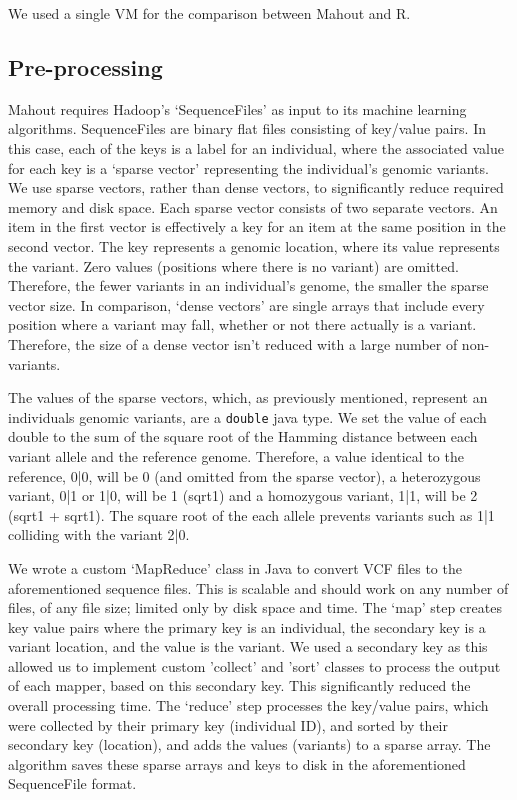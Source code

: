 \documentclass{bioinfo}
\begin{document}
\begin{methods}
We used a single VM for the comparison between Mahout and R.

\subsection*{Pre-processing}
\label{Sec:preprocessing}
Mahout requires Hadoop's `SequenceFiles' as input to its machine learning algorithms. SequenceFiles are binary flat files consisting of key/value pairs. In this case, each of the keys is a
label for an individual, where the associated value for each key is a `sparse vector' representing the individual's genomic variants. We use sparse vectors, rather than
dense vectors, to significantly reduce required memory and disk space. Each sparse vector consists of two separate vectors. An item in the first vector is
effectively a key for an item at the same position in the second vector. The key represents a genomic location, where its value represents the variant. Zero values (positions where there is no variant)
are omitted. Therefore, the fewer variants in an individual's genome, the smaller the sparse vector size. In comparison, `dense vectors' are single arrays that
include every position where a variant may fall, whether or not there actually is a variant. Therefore, the size of a dense vector isn't reduced with a large number of non-variants.

The values of the sparse vectors, which, as previously mentioned, represent an individuals genomic variants, are a \texttt{double} java type.
We set the value of each double to the sum of the square root of the Hamming distance between each variant allele and the reference genome. Therefore, a value identical to the reference, 0|0, will be 0 (and omitted from the sparse vector),
a heterozygous variant, 0|1 or 1|0, will be 1 (sqrt1) and a homozygous variant, 1|1, will be 2 (sqrt1 + sqrt1). The square root of the each allele prevents variants such as 1|1 colliding with the variant 2|0.

We wrote a custom `MapReduce' class in Java to convert VCF files to the aforementioned sequence files. This is scalable and should work on any number of files,
of any file size; limited only by disk space and time. The `map' step creates key value pairs where the primary key is an individual, the secondary key is a variant location, and the value is the variant.
We used a secondary key as this allowed us to implement custom 'collect' and 'sort' classes to process the output of each mapper, based on this secondary key.
This significantly reduced the overall processing time.
The `reduce' step processes the key/value pairs, which were collected by their primary key (individual ID), and sorted by their secondary key (location), and  adds the values (variants) to a sparse array.
The algorithm saves these sparse arrays and keys to disk in the aforementioned SequenceFile format.   



\end{methods}
\end{document}
